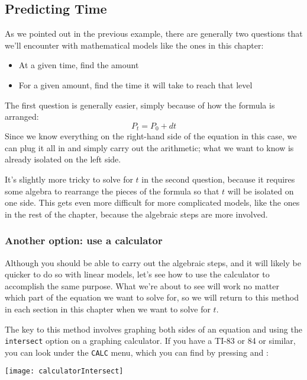 \subsection{Predicting Time}
As we pointed out in the previous example, there are generally two questions that we'll encounter with mathematical models like the ones in this chapter:
\begin{itemize}
\item At a given time, find the amount
\item For a given amount, find the time it will take to reach that level
\end{itemize}

The first question is generally easier, simply because of how the formula is arranged:
\[P_t = P_0 + dt\]
Since we know everything on the right-hand side of the equation in this case, we can plug it all in and simply carry out the arithmetic; what we want to know is already isolated on the left side.

It's slightly more tricky to solve for $t$ in the second question, because it requires some algebra to rearrange the pieces of the formula so that $t$ will be isolated on one side.  This gets even more difficult for more complicated models, like the ones in the rest of the chapter, because the algebraic steps are more involved.

\subsubsection*{Another option: use a calculator}
Although you should be able to carry out the algebraic steps, and it will likely be quicker to do so with linear models, let's see how to use the calculator to accomplish the same purpose.  What we're about to see will work no matter which part of the equation we want to solve for, so we will return to this method in each section in this chapter when we want to solve for $t$.
\vfill
\pagebreak

The key to this method involves graphing both sides of an equation and using the \texttt{intersect} option on a graphing calculator.  If you have a TI-83 or 84 or similar, you can look under the \texttt{CALC} menu, which you can find by pressing  and :
\begin{center}
\texttt{[image: calculatorIntersect]}
\end{center}

